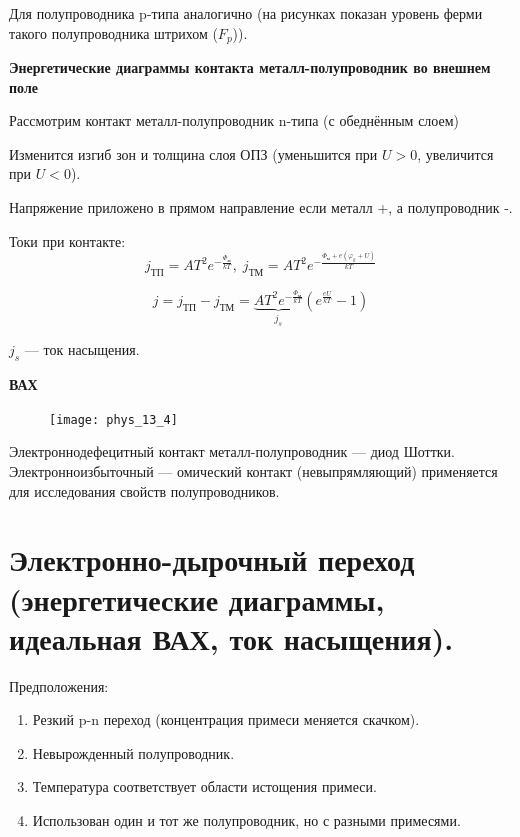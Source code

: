 Для полупроводника p-типа аналогично (на рисунках показан уровень ферми такого полупроводника штрихом ($F_p$)).

\textbf{Энергетические диаграммы контакта металл-полупроводник во внешнем поле}

Рассмотрим контакт металл-полупроводник n-типа (с обеднённым слоем)

\begin{figure}[h!]
    \centering
\end{figure}

Изменится изгиб зон и толщина слоя ОПЗ (уменьшится при $U>0$, увеличится при $U<0$).

Напряжение приложено в прямом направление если металл +, а полупроводник -.

Токи при контакте: $$
j_{\text{ТП}}=A T^2 e^{-\frac{\Phi_\text{м}}{k T}}, \;
j_{\text{ТМ}}=A T^2 e^{-\frac{\Phi_\text{м} + e(\varphi_k+U)}{k T}}
$$

$$
j=j_{\text{ТП}}-j_{\text{ТМ}}=\underbrace{A T^2 e^{-\frac{\Phi_\text{м}}{k T}}}_{j_s}\left(e^{\frac{e U}{k T}}-1\right)
$$


$j_s$ --- ток насыщения.

\textbf{ВАХ}

\begin{figure}[h!]
    \centering
    \texttt{[image: phys\_13\_4]}
\end{figure}

Электроннодефецитный контакт металл-полупроводник --- диод Шоттки. Электронноизбыточный --- омический контакт (невыпрямляющий) применяется для исследования свойств полупроводников.

\section{Электронно-дырочный переход (энергетические диаграммы, идеальная ВАХ, ток насыщения).}

Предположения:

\begin{enumerate}
    \item Резкий p-n переход (концентрация примеси меняется скачком).
    \item Невырожденный полупроводник.
    \item Температура соответствует области истощения примеси.
    \item Использован один и тот же полупроводник, но с разными примесями.
\end{enumerate}

